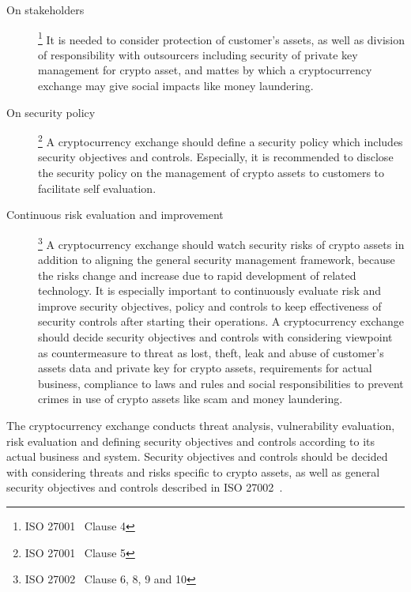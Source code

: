 \begin{description}
 \item[On stakeholders]\footnote{ISO 27001~\cite{ISO27001} Clause 4}
       It is needed to consider protection of customer’s assets, as well as division of responsibility with outsourcers including security of private key management for crypto asset, and mattes by which a cryptocurrency exchange may give social impacts like money laundering.
 \item[On security policy]\footnote{ISO 27001~\cite{ISO27001} Clause 5}
       A cryptocurrency exchange should define a security policy which includes security objectives and controls. Especially, it is recommended to disclose the security policy on the management of crypto assets to customers to facilitate self evaluation.
 \item[Continuous risk evaluation and improvement]\footnote{ISO 27002~\cite{ISO27002} Clause 6, 8, 9 and 10}
       A cryptocurrency exchange should watch security risks of crypto assets in addition to aligning the general security management framework, because the risks change and increase due to rapid development of related technology. It is especially important to continuously evaluate risk and improve security objectives, policy and controls to keep effectiveness of security controls after starting their operations. A cryptocurrency exchange should decide security objectives and controls with considering viewpoint as countermeasure to threat as lost, theft, leak and abuse of customer’s assets data and private key for crypto assets, requirements for actual business, compliance to laws and rules and social responsibilities to prevent crimes in use of crypto assets like scam and money laundering.
\end{description}
The cryptocurrency exchange conducts threat analysis, vulnerability evaluation, risk evaluation and defining security objectives and controls according to its actual business and system. Security objectives and controls should be decided with considering threats and risks specific to crypto assets, as well as general security objectives and controls described in ISO 27002~\cite{ISO27002}.
